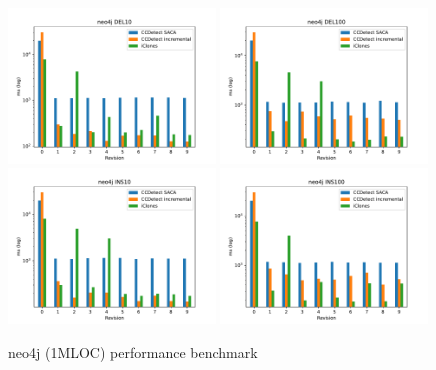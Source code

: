 \begin{figure}
    \begin{center}
        \includegraphics[width=0.49\textwidth]{figures/performancegraphs/neo4j_DEL10.pdf}
        \includegraphics[width=0.49\textwidth]{figures/performancegraphs/neo4j_DEL100.pdf}
        \includegraphics[width=0.49\textwidth]{figures/performancegraphs/neo4j_INS10.pdf}
        \includegraphics[width=0.49\textwidth]{figures/performancegraphs/neo4j_INS100.pdf}
    \end{center}
    \caption{neo4j (1MLOC) performance benchmark}
    \label{fig:neo4j}
\end{figure}

